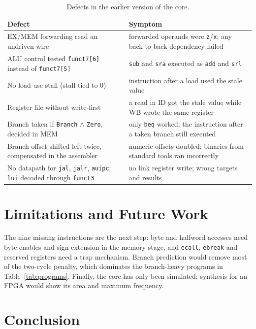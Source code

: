 \documentclass[12pt]{article}
\begin{document}
\begin{table}[ht]
\centering
\caption{Defects in the earlier version of the core.}
\label{tab:bugs}
\small
\renewcommand{\arraystretch}{1.25}
\begin{tabular}{p{6.2cm}p{7.3cm}}
\toprule
Defect & Symptom \\
\midrule
EX/MEM forwarding read an undriven wire & forwarded operands were \texttt{z}/\texttt{x}; any back-to-back dependency failed \\
ALU control tested \texttt{funct7[6]} instead of \texttt{funct7[5]} & \texttt{sub} and \texttt{sra} executed as \texttt{add} and \texttt{srl} \\
No load-use stall (stall tied to 0) & instruction after a load used the stale value \\
Register file without write-first & a read in ID got the stale value while WB wrote the same register \\
Branch taken if \texttt{Branch} $\wedge$ \texttt{Zero}, decided in MEM & only \texttt{beq} worked; the instruction after a taken branch still executed \\
Branch offset shifted left twice, compensated in the assembler & numeric offsets doubled; binaries from standard tools ran incorrectly \\
No datapath for \texttt{jal}, \texttt{jalr}, \texttt{auipc}; \texttt{lui} decoded through \texttt{funct3} & no link register write; wrong targets and results \\
\bottomrule
\end{tabular}
\end{table}

\section{Limitations and Future Work}

The nine missing instructions are the next step: byte and halfword accesses need
byte enables and sign extension in the memory stage, and \texttt{ecall},
\texttt{ebreak} and reserved registers need a trap mechanism. Branch prediction
would remove most of the two-cycle penalty, which dominates the branch-heavy
programs in Table~\ref{tab:programs}. Finally, the core has only been simulated;
synthesis for an FPGA would show its area and maximum frequency.

\section{Conclusion}
\end{document}
